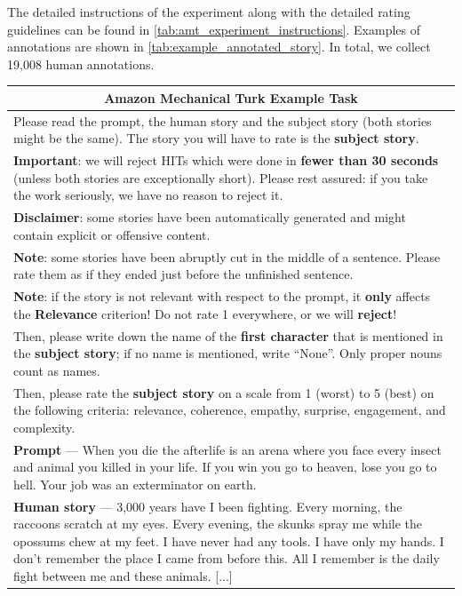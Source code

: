 The detailed instructions of the experiment along with the detailed rating guidelines can be found in \autoref{tab:amt_experiment_instructions}. Examples of annotations are shown in \autoref{tab:example_annotated_story}. In total, we collect 19,008 human annotations.

\clearpage

\begin{longtable}[h]{p{}}
\label{tab:amt_experiment_instructions}\\
\toprule
\multicolumn{1}{c}{\Large Amazon Mechanical Turk Example Task}\\
\midrule
Please read the prompt, the human story and the subject story (both stories might be the same). The story you will have to rate is the \textbf{subject story}.\\
\textbf{Important}: we will reject HITs which were done in \textbf{fewer than 30 seconds} (unless both stories are exceptionally short). Please rest assured: if you take the work seriously, we have no reason to reject it.\\
\textbf{Disclaimer}: some stories have been automatically generated and might contain explicit or offensive content.\\
\textbf{Note}: some stories have been abruptly cut in the middle of a sentence. Please rate them as if they ended just before the unfinished sentence.\\
\textbf{Note}: if the story is not relevant with respect to the prompt, it \textbf{only} affects the \textbf{Relevance} criterion! Do not rate 1 everywhere, or we will \textbf{reject}!\\
Then, please write down the name of the \textbf{first character} that is mentioned in the \textbf{subject story}; if no name is mentioned, write “None”. Only proper nouns count as names.\\
Then, please rate the \textbf{subject story} on a scale from 1 (worst) to 5 (best) on the following criteria: relevance, coherence, empathy, surprise, engagement, and complexity.\\
\midrule
\textbf{Prompt} --- When you die the afterlife is an arena where you face every insect and animal you killed in your life. If you win you go to heaven, lose you go to hell. Your job was an exterminator on earth.\\
\midrule
\textbf{Human story} --- 3,000 years have I been fighting. Every morning, the raccoons scratch at my eyes. Every evening, the skunks spray me while the opossums chew at my feet. I have never had any tools. I have only my hands. I don’t remember the place I came from before this. All I remember is the daily fight between me and these animals. [...]\\

\end{longtable}
